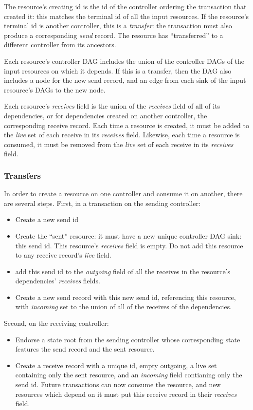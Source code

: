 \documentclass[a4paper,USenglish,cleveref, autoref, thm-restate, anonymous]{lipics-v2021}
\begin{document}
The resource's creating id is the id of the controller ordering the transaction that created it: this matches the terminal id of all the input resources.
If the resource's terminal id is another controller, this is a \emph{transfer}: the transaction must also produce a corresponding \emph{send} record. 
The resource has ``transferred'' to a different controller from its ancestors. 

Each resource's controller DAG includes the union of the controller DAGs of the input resources on which it depends.
If this is a transfer, then the DAG also includes a node for the new send record, and an edge from each sink of the input resource's DAGs to the new node.

Each resource's \emph{receives} field is the union of the \emph{receives} field of all of its dependencies, or for dependencies created on another controller, the corresponding receive record.
Each time a resource is created, it must be added to the \emph{live} set of each receive in its \emph{receives} field.
Likewise, each time a resource is consumed, it must be removed from the \emph{live} set of each receive in its \emph{receives} field. 

\subsubsection{Transfers}
In order to create a resource on one controller and consume it on another, there are several steps.
First, in a transaction on the sending controller:
\begin{itemize}
\item Create a new send id
\item Create the ``sent'' resource: it must have a new unique controller DAG sink: this send id. This resource's \emph{receives} field is empty. Do not add this resource to any receive record's \emph{live} field. 
\item add this send id to the \emph{outgoing} field of all the receives in the resource's dependencies' \emph{receives} fields.
\item Create a new send record with this new send id, referencing this resource, with \emph{incoming} set to the union of all of the receives of the dependencies. 
\end{itemize}
Second, on the receiving controller:
\begin{itemize}
  \item Endorse a state root from the sending controller whose corresponding state features the send record and the sent resource.
  \item Create a receive record  with a unique id, empty outgoing, a live set containing only the sent resource, and an \emph{incoming} field contianing only the send id.
        Future transactions can now consume the resource, and new resources which depend on it must put this receive record in their \emph{receives} field. 
\end{itemize}
\end{document}
